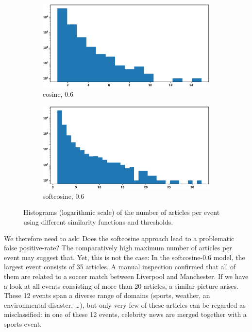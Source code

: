 \documentclass[a4paper,man,natbib,floatsintext,mask]{apa6}
\begin{document}
\begin{figure}[h!]
\begin{subfigure}{.5\textwidth}
  \centering
  \includegraphics[width=.8\linewidth]{figures/cos06.eps}  
  \caption{cosine, 0.6}
  \label{fig:sub-cos06}
\end{subfigure}
\begin{subfigure}{.5\textwidth}
  \centering
  \includegraphics[width=.8\linewidth]{figures/softcos06.eps}  
  \caption{softcosine, 0.6}
  \label{fig:sub-softcos06}
\end{subfigure}
\caption{Histograms (logarithmic scale) of the number of articles per event using different similarity functions and thresholds.}
\label{fig:histograms}
\end{figure}

We therefore need to ask: Does the softcosine approach lead to a problematic false positive-rate?
The comparatively high maximum number of articles per event may suggest that. 
Yet, this is not the case: In the softcosine-0.6 model, the largest event consists of 35 articles. A manual inspection confirmed that all of them are related to a soccer match between Liverpool and Manchester. 
If we have a look at all events consisting of more than 20 articles, a similar picture arises. These 12 events span a diverse range of domains (sports, weather, an environmental disaster, \ldots), but only very few of these articles can be regarded as misclassified: in one of these 12 events, celebrity news are merged together with a sports event.
\end{document}
